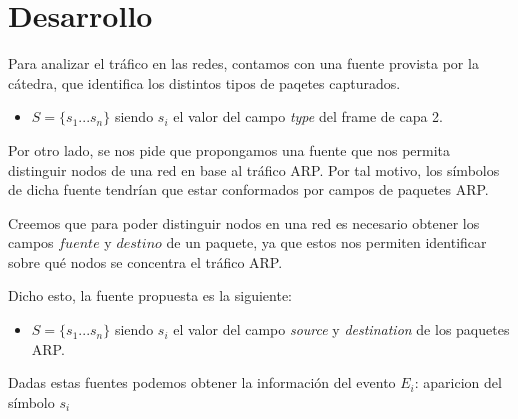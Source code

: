 \section{Desarrollo}

Para analizar el tráfico en las redes, contamos con una fuente provista por la cátedra, que identifica los distintos tipos de paqetes capturados.

\begin{itemize}
\item $S=\{s_1 ... s_n\}$ siendo $s_i$ el valor del campo \textit{type} del frame de capa 2.\\
\end{itemize}

Por otro lado, se nos pide que propongamos una fuente que nos permita distinguir nodos de una red en base al tráfico ARP. Por tal motivo, los símbolos de dicha fuente tendrían que estar conformados por campos de paquetes ARP.

Creemos que para poder distinguir nodos en una red es necesario obtener los campos $fuente$ y $destino$ de un paquete, ya que estos nos permiten identificar sobre qué nodos se concentra el tráfico ARP.

Dicho esto, la fuente propuesta es la siguiente:

\begin{itemize}
\item $S=\{s_1 ... s_n\}$ siendo $s_i$ el valor del campo \textit{source} y \textit{destination} de los paquetes ARP.\\
\end{itemize}


Dadas estas fuentes podemos obtener la información del evento $E_i$: aparicion del símbolo $s_i$
